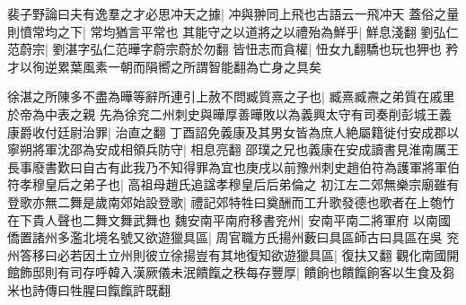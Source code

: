 裴子野論曰夫有逸羣之才必思冲天之據|{
	冲與翀同上飛也古語云一飛冲天}
蓋俗之量則憤常均之下|{
	常均猶言平常也}
其能守之以道將之以禮殆為鮮乎|{
	鮮息淺翻}
劉弘仁范蔚宗|{
	劉湛字弘仁范曄字蔚宗蔚於勿翻}
皆忸志而貪權|{
	忸女九翻驕也玩也狎也}
矜才以徇逆累葉風素一朝而隕嚮之所謂智能翻為亡身之具矣

徐湛之所陳多不盡為曄等辭所連引上赦不問臧質熹之子也|{
	臧熹臧燾之弟質在戚里於帝為中表之親}
先為徐兖二州刺史與曄厚善曄敗以為義興太守有司奏削彭城王義康爵收付廷尉治罪|{
	治直之翻}
丁酉詔免義康及其男女皆為庶人絶屬籍徙付安成郡以寧朔將軍沈邵為安成相領兵防守|{
	相息亮翻}
邵璞之兄也義康在安成讀書見淮南厲王長事廢書歎曰自古有此我乃不知得罪為宜也庚戌以前豫州刺史趙伯符為護軍將軍伯符孝穆皇后之弟子也|{
	高祖母趙氏追諡孝穆皇后后弟倫之}
初江左二郊無樂宗廟雖有登歌亦無二舞是歲南郊始設登歌|{
	禮記郊特牲曰奠酬而工升歌發德也歌者在上匏竹在下貴人聲也二舞文舞武舞也}
魏安南平南府移書兖州|{
	安南平南二將軍府}
以南國僑置諸州多濫北境名號又欲遊獵具區|{
	周官職方氏揚州藪曰具區師古曰具區在吳}
兖州答移曰必若因土立州則彼立徐揚豈有其地復知欲遊獵具區|{
	復扶又翻}
觀化南國開館飾邸則有司存呼韓入漢厥儀未泯饋餼之秩每存豐厚|{
	饋餉也饋餼餉客以生食及芻米也詩傳曰牲腥曰餼餼許既翻}


